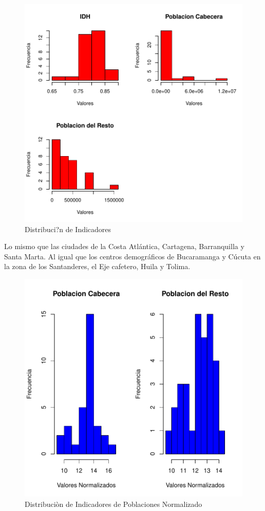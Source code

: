 \begin{figure}[h]

\includegraphics{univariada-hist}
\caption{Distribuci?n de Indicadores}
\label{hist}
\end{figure}

Lo mismo que las ciudades de la Costa Atlántica, Cartagena, Barranquilla y Santa Marta. Al igual que los centros demográficos de Bucaramanga y Cúcuta en la zona de los Santanderes, el Eje cafetero, Huila y Tolima.

\begin{figure}[h]
\includegraphics{univariada-hist1}
\caption{Distribuciòn de Indicadores de Poblaciones Normalizado}
\label{hist1}
\end{figure}

\endinput
